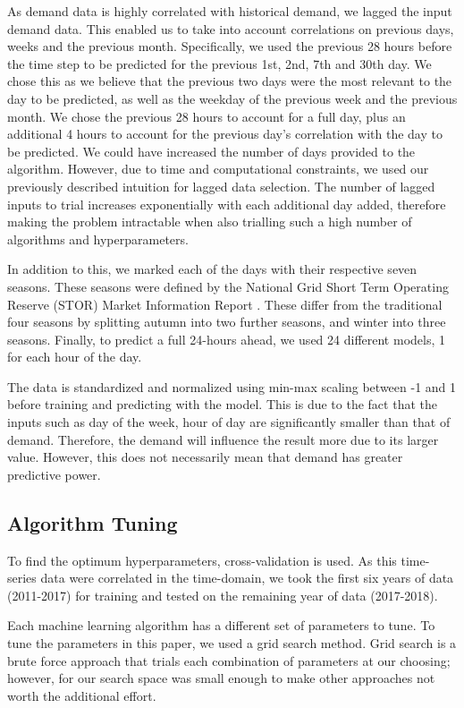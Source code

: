 \documentclass[final,3p,times,twocolumn,numbers]{elsarticle}
\begin{document}
As demand data is highly correlated with historical demand, we lagged the input demand data. This enabled us to take into account correlations on previous days, weeks and the previous month. Specifically, we used the previous 28 hours before the time step to be predicted for the previous 1st, 2nd, 7th and 30th day. We chose this as we believe that the previous two days were the most relevant to the day to be predicted, as well as the weekday of the previous week and the previous month. We chose the previous 28 hours to account for a full day, plus an additional 4 hours to account for the previous day's correlation with the day to be predicted. We could have increased the number of days provided to the algorithm. However, due to time and computational constraints, we used our previously described intuition for lagged data selection. The number of lagged inputs to trial increases exponentially with each additional day added, therefore making the problem intractable when also trialling such a high number of algorithms and hyperparameters. 

In addition to this, we marked each of the days with their respective seven seasons. These seasons were defined by the National Grid Short Term Operating Reserve (STOR) Market Information Report \cite{ESO2019}. These differ from the traditional four seasons by splitting autumn into two further seasons, and winter into three seasons. Finally, to predict a full 24-hours ahead, we used 24 different models, 1 for each hour of the day. 


The data is standardized and normalized using min-max scaling between -1 and 1 before training and predicting with the model. This is due to the fact that the inputs such as day of the week, hour of day are significantly smaller than that of demand. Therefore, the demand will influence the result  more due to its larger value. However, this does not necessarily mean that demand has greater predictive power.

\subsection{Algorithm Tuning}

To find the optimum hyperparameters, cross-validation is used. As this time-series data were correlated in the time-domain, we took the first six years of data (2011-2017) for training and tested on the remaining year of data (2017-2018).

Each machine learning algorithm has a different set of parameters to tune. To tune the parameters in this paper, we used a grid search method. Grid search is a brute force approach that trials each combination of parameters at our choosing; however, for our search space was small enough to make other approaches not worth the additional effort.
\end{document}

